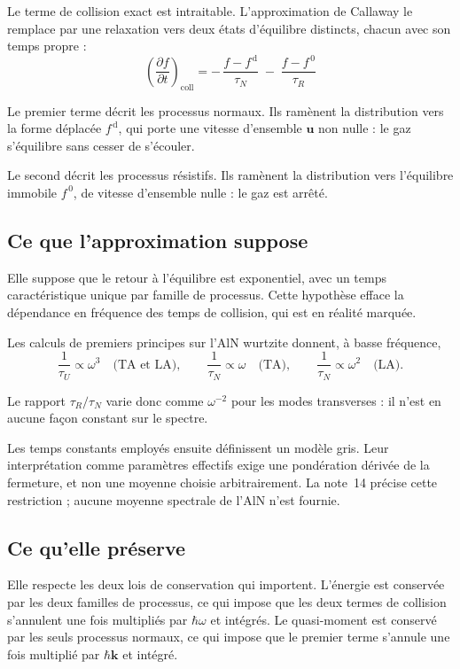 \documentclass[11pt,a4paper]{article}
\begin{document}
Le terme de collision exact est intraitable. L'approximation de Callaway le remplace par une
relaxation vers deux états d'équilibre distincts, chacun avec son temps propre :
\[ \boxed{\;\left(\frac{\partial f}{\partial t}\right)_{\!\mathrm{coll}}
= -\,\frac{f - f^{\,\mathrm{d}}}{\tau_N} \;-\; \frac{f - f^{\,0}}{\tau_R}\;} \]

Le premier terme décrit les processus normaux. Ils ramènent la distribution vers la forme déplacée
$f^{\,\mathrm{d}}$, qui porte une vitesse d'ensemble $\mathbf{u}$ non nulle : le gaz s'équilibre
sans cesser de s'écouler.

Le second décrit les processus résistifs. Ils ramènent la distribution vers l'équilibre immobile
$f^{\,0}$, de vitesse d'ensemble nulle : le gaz est arrêté.

\subsection{Ce que l'approximation suppose}

Elle suppose que le retour à l'équilibre est exponentiel, avec un temps caractéristique unique par
famille de processus. Cette hypothèse efface la dépendance en fréquence des temps de collision, qui
est en réalité marquée.

Les calculs de premiers principes sur l'AlN wurtzite donnent, à basse fréquence,
\[ \frac{1}{\tau_U} \propto \omega^3 \quad\text{(TA et LA)} , \qquad
\frac{1}{\tau_N} \propto \omega \quad\text{(TA)} , \qquad
\frac{1}{\tau_N} \propto \omega^2 \quad\text{(LA)} . \]

Le rapport $\tau_R/\tau_N$ varie donc comme $\omega^{-2}$ pour les modes transverses : il n'est en
aucune façon constant sur le spectre.

Les temps constants employés ensuite définissent un modèle gris. Leur interprétation comme
paramètres effectifs exige une pondération dérivée de la fermeture, et non une moyenne choisie
arbitrairement. La note~14 précise cette restriction ; aucune moyenne spectrale de l'AlN n'est fournie.

\subsection{Ce qu'elle préserve}

Elle respecte les deux lois de conservation qui importent. L'énergie est conservée par les deux
familles de processus, ce qui impose que les deux termes de collision s'annulent une fois
multipliés par $\hbar\omega$ et intégrés. Le quasi-moment est conservé par les seuls processus
normaux, ce qui impose que le premier terme s'annule une fois multiplié par $\hbar\mathbf{k}$ et
intégré.
\end{document}
